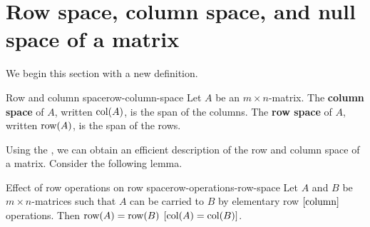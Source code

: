 \section{Row space, column space, and null space of a matrix}

We begin this section with a new definition.

\begin{definition}{Row and column space}{row-column-space}
  Let $A$ be an $m\times n$-matrix. The \textbf{column
    space} of $A$,
  written $\mbox{\rm col}(A)$, is the span of the columns. The \textbf{row
    space} of $A$, written
  $\mbox{\rm row}(A)$, is the span of the rows.
\end{definition}

Using the {\rref}, we can obtain an efficient description of the row
and column space of a matrix. Consider the following lemma.

\begin{lemma}{Effect of row operations on row space}{row-operations-row-space}
  Let $A$ and $B$ be $m\times n$-matrices such that $A$ can be carried
  to $B$ by elementary row $\left[\mbox{column}\right]$ operations. Then
  $\mbox{\rm row}(A)=\mbox{\rm row}(B)$ $\left[\mbox{\rm col}(A)=\mbox{\rm col}(B)\right]$.
\end{lemma}

